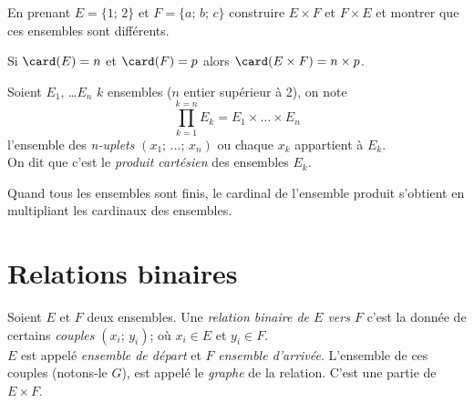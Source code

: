 \begin{exercice}[]
    En prenant $E=\lbrace 1;\,2\rbrace$ et $F=\lbrace a;\,b;\,c\rbrace$ construire $E\times F$ et $F\times E$ et montrer que ces ensembles sont différents.
\end{exercice}

\begin{propriete}[]
    Si $\card(E)=n$ et $\card(F)=p$ alors $\card(E\times F)=n\times p$.
\end{propriete}

\begin{definition}
    Soient $E_1$, \ldots $E_n$ $k$ ensembles ($n$ entier supérieur à 2), on note
    $$\prod_{k=1}^{k=n}E_k=E_1\times\ldots\times E_n$$
    l'ensemble des \textit{n-uplets} $(x_1;\,\ldots;\,x_n)$ ou chaque $x_k$ appartient à $E_k$.\\ On dit que c'est le \textit{produit cartésien} des ensembles $E_k$.
\end{definition}

\begin{propriete}[]
    Quand tous les ensembles sont finis, le cardinal de l'ensemble produit s'obtient en multipliant les cardinaux des ensembles.
\end{propriete}
\section{Relations binaires}
\begin{definition}
    Soient $E$ et $F$ deux ensembles. Une \textit{relation binaire de $E$ vers $F$} c'est la donnée de certains \textit{couples} $(x_i;\,y_i)$; où $x_i\in E$ et $y_i\in F$.\\
    $E$ est appelé \textit{ensemble de départ} et $F$ \textit{ensemble d'arrivée}.
    L'ensemble de ces couples (notons-le $G$), est appelé le \textit{graphe} de la relation. C'est une partie de $E\times F$.
\end{definition}


